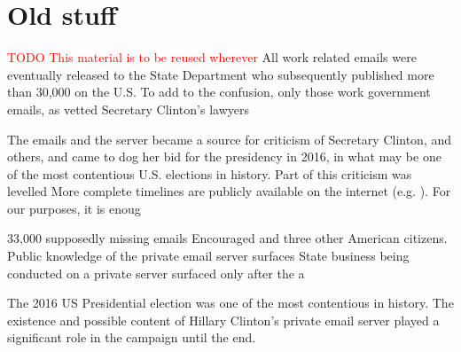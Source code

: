 \documentclass[journal]{vgtc}                %
\newcommand*{\TODO}[1]{\textcolor{red}{TODO #1}}
\begin{document}
\section{Old stuff}
\TODO{This material is to be reused wherever}
All work related emails were eventually released to the State Department who subsequently published more than 30,000 on the U.S.  To add to the confusion, only those work government emails, as vetted Secretary Clinton's lawyers 

The emails and the server became a source for criticism of Secretary Clinton, and others, and came to dog her bid for the presidency in 2016, in what may be one of the most contentious U.S. elections in history.   Part of this criticism was levelled  More complete timelines are publicly available on the internet (e.g. \cite{attkissonTimeline, TimeMagEverything, clintonWikipedia}).  For our purposes, it is enoug
 
 
 33,000 supposedly missing emails
 Encouraged 
 and three other American citizens.  Public knowledge of the private email server surfaces State business being conducted on a private server surfaced only after the a

The 2016 US Presidential election was one of the most contentious in history.  The existence and possible content of Hillary Clinton's private email server played a significant role in the campaign until the end.  
\end{document}
